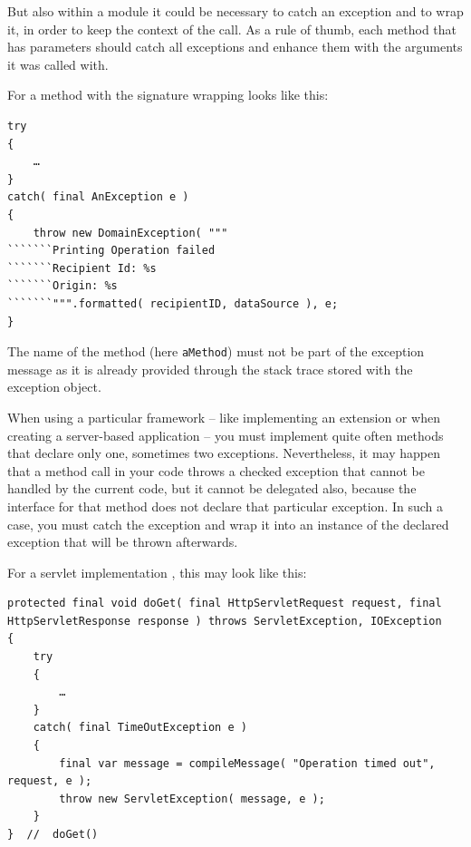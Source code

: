 But also within a module it could be necessary to catch an exception and to wrap it, in order to keep the context of the call. As a rule of thumb, each method that has parameters should catch all exceptions and enhance them with the arguments it was called with.

For a method with the signature  wrapping looks like this:
\begin{lstlisting}
try
{
    …
}
catch( final AnException e ) 
{
    throw new DomainException( """
```````Printing Operation failed
```````Recipient Id: %s
```````Origin: %s
```````""".formatted( recipientID, dataSource ), e;
}
\end{lstlisting}

The name of the method (here \lstinline|aMethod|) must not be part of the exception message as it is already provided through the stack trace stored with the exception object.

When using a particular framework – like implementing an extension or when creating a server-based application – you must implement quite often methods that declare only one, sometimes two exceptions. Nevertheless, it may happen that a method call in your code throws a checked exception that cannot be handled by the current code, but it cannot be delegated also, because the interface for that method does not declare that particular exception. In such a case, you must catch the exception and wrap it into an instance of the declared exception that will be thrown afterwards.

For a servlet implementation \autocite{JAKARTA_EE_HTTPSERVLET_CLASS}, this may look like this:
\begin{lstlisting}
protected final void doGet( final HttpServletRequest request, final HttpServletResponse response ) throws ServletException, IOException
{
    try
    {
        …
    }
    catch( final TimeOutException e )
    {
        final var message = compileMessage( "Operation timed out", request, e );
        throw new ServletException( message, e );
    }
}  //  doGet()
\end{lstlisting}

